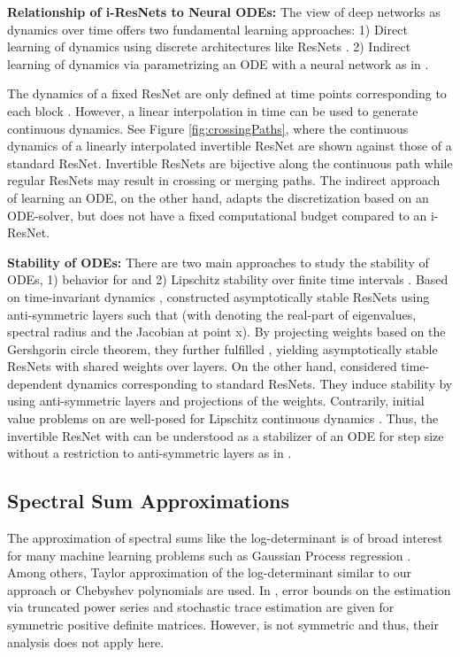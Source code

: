 \documentclass{article}
\begin{document}
\textbf{Relationship of i-ResNets to Neural ODEs:} 
The view of deep networks as dynamics over time offers two fundamental learning approaches: 1) Direct learning of dynamics using discrete architectures like ResNets \citep{haberRuthotto, ruthottoHaber, luODE, naisnet}. 2) Indirect learning of dynamics via parametrizing an ODE with a neural network as in \citet{chen2018neural, ffjord}.

The dynamics  of a fixed ResNet  are only defined at time
points  corresponding to each block . However, a linear interpolation in time can be used to generate continuous dynamics. See Figure \ref{fig:crossingPaths}, where the continuous dynamics of a linearly interpolated invertible ResNet are shown against those of a standard ResNet. Invertible ResNets are bijective along the continuous path while regular ResNets may result in crossing or merging paths. The indirect approach of learning an ODE, on the other hand, adapts the discretization based on an ODE-solver, but does not have a fixed computational budget compared to an i-ResNet. 

\textbf{Stability of ODEs:} There are two main approaches to study the stability of ODEs, 1) behavior for  and 2) Lipschitz stability over finite time intervals . Based on time-invariant dynamics , \citep{naisnet} constructed asymptotically stable ResNets using anti-symmetric layers such that   (with  denoting the real-part of eigenvalues,  spectral radius and  the Jacobian at point x). By projecting weights based on the Gershgorin circle theorem, they further fulfilled , yielding asymptotically stable ResNets with shared weights over layers. On the other hand, \citep{haberRuthotto, ruthottoHaber} considered time-dependent dynamics  corresponding to standard ResNets. They induce stability by using anti-symmetric layers and projections of the weights.  Contrarily, initial value problems on  are well-posed for Lipschitz continuous dynamics \citep{ascher2008numerical}. Thus, the invertible ResNet with  can be understood as a stabilizer of an ODE for step size  without a restriction to anti-symmetric layers as in \citet{ruthottoHaber, haberRuthotto, naisnet}.

\subsection{Spectral Sum Approximations}

The approximation of spectral sums like the log-determinant is of broad interest for many machine learning problems such as Gaussian Process regression \citep{DongGPs}. Among others, Taylor approximation \citep{BOUTSIDIS201795} of the log-determinant similar to our approach or Chebyshev polynomials \citep{Han} are used. In \citet{BOUTSIDIS201795}, error bounds on the estimation via truncated power series and stochastic trace estimation are given for symmetric positive definite matrices. However,  is not symmetric and thus, their analysis does not apply here.
\end{document}
